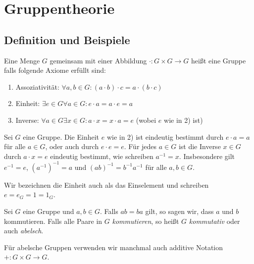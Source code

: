 \graphicspath{{Images/}}

\chapter{Gruppentheorie}
\section{Definition und Beispiele}

\begin{definition}
	Eine Menge $G$ gemeinsam mit einer Abbildung $\cdot : G \times G \to G$ heißt eine Gruppe falls folgende Axiome erfüllt sind:
	\begin{enumerate}[1)]
		\item Assoziativität: $\forall a,b \in G: (a \cdot  b) \cdot  c = a \cdot (b \cdot c)$
		\item Einheit: $\exists e \in G \forall a \in G: e \cdot a = a \cdot e = a$
		\item Inverse: $\forall a \in G \exists x \in G: a \cdot  x = x \cdot a = e$ (wobei $e$ wie in 2) ist)
	\end{enumerate}
\end{definition}

\begin{lemma}
	Sei $G$ eine Gruppe.  Die Einheit $e$ wie in 2) ist eindeutig bestimmt durch $e \cdot  a = a$
	für alle $a \in G$, oder  auch durch $e \cdot e = e$. Für jedes $a \in G$ ist die Inverse $x \in G$ durch
	$a \cdot x = e$ eindeutig bestimmt, wie schreiben $a^{-1} = x$.
	Insbesondere gilt $e^{-1} = e$, $(a^{-1})^{-1} = a$ und $(ab)^{-1} = b^{-1} a^{-1}$ für alle $a,b \in G$.
\end{lemma}

\begin{remark}
	Wir bezeichnen die Einheit auch als das Einselement und schreiben $e = e_{G} = 1 = 1_{G}$.
\end{remark}


\begin{definition}
	Sei $G$ eine Gruppe und $a,b \in G$. Falls $ab = ba$ gilt, so sagen wir, dass $a$ und $b$ kommutieren.
	Falls alle Paare in $G$ \emph{kommutieren}, so heißt $G$ \emph{kommutativ} oder auch \emph{abelsch}.
\end{definition}

\begin{remark}
	Für abelsche Gruppen verwenden wir manchmal auch additive Notation $+ : G \times G \to G$.
\end{remark}


